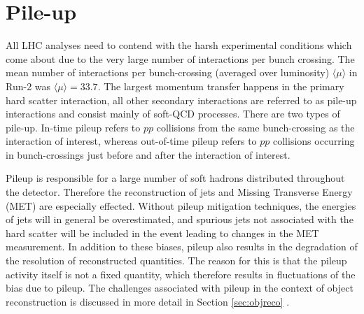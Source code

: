 \clearpage
\section{Pile-up}

All LHC analyses need to contend with the harsh experimental conditions which come about due to the very large number of interactions per bunch crossing. The mean number of interactions per bunch-crossing (averaged over luminosity) $\langle\mu\rangle$ in Run-2 was $\langle\mu\rangle = 33.7$. The largest momentum transfer happens in the primary hard scatter interaction, all other secondary interactions are referred to as pile-up interactions and consist mainly of soft-QCD processes. There are two types of pile-up. In-time pileup refers to $pp$ collisions from the same bunch-crossing as the interaction of interest, whereas out-of-time pileup refers to $pp$ collisions occurring in bunch-crossings just before and after the interaction of interest. 

Pileup is responsible for a large number of soft hadrons distributed throughout the detector. Therefore the reconstruction of jets and Missing Transverse Energy (MET) are especially effected. Without pileup mitigation techniques, the energies of jets will in general be overestimated, and spurious jets not associated with the hard scatter will be included in the event leading to changes in the MET measurement. In addition to these biases, pileup also results in the degradation of the resolution of reconstructed quantities. The reason for this is that the pileup activity itself is not a fixed quantity, which therefore results in fluctuations of the bias due to pileup. The challenges associated with pileup in the context of object reconstruction is discussed in more detail in Section \ref{sec:objreco} \cite{Buckley:PCP,LHC:pileup}.
